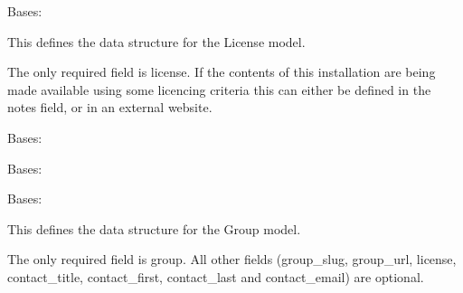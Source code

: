 \documentclass[letterpaper,10pt,english]{sphinxmanual}
\begin{document}
\begin{fulllineitems}
\label{api:groups.models.License}
Bases: 

This defines the data structure for the License model.

The only required field is license.
If the contents of this installation are being made available using some licencing criteria this can either be defined in the notes field, or in an external website.


\begin{fulllineitems}
\label{api:groups.models.License.DoesNotExist}
Bases: 

\end{fulllineitems}



\begin{fulllineitems}
\label{api:groups.models.License.MultipleObjectsReturned}
Bases: 

\end{fulllineitems}



\begin{fulllineitems}
\label{api:groups.models.License.group_set}
\end{fulllineitems}


\end{fulllineitems}



\begin{fulllineitems}
Bases: 

This defines the data structure for the Group model.

The only required field is group.
All other fields (group\_slug, group\_url, license, contact\_title, contact\_first, contact\_last and contact\_email) are optional.

\end{fulllineitems}
\end{document}
